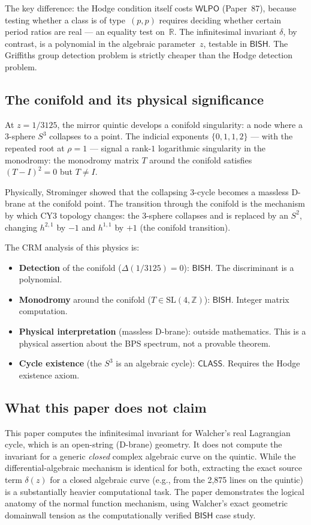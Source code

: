 \documentclass[11pt]{article}
\theoremstyle{plain}
\theoremstyle{definition}
\theoremstyle{remark}
\newcommand{\Z}{\mathbb{Z}}
\newcommand{\R}{\mathbb{R}}
\newcommand{\SL}{\mathrm{SL}}
\newcommand{\BISH}{\ensuremath{\mathsf{BISH}}}
\newcommand{\WLPO}{\ensuremath{\mathsf{WLPO}}}
\newcommand{\CLASS}{\ensuremath{\mathsf{CLASS}}}
\begin{document}
The key difference: the Hodge condition itself costs $\WLPO$ (Paper~87), because testing whether a class is of type~$(p,p)$ requires deciding whether certain period ratios are real --- an equality test on~$\R$. The infinitesimal invariant $\delta$, by contrast, is a polynomial in the algebraic parameter~$z$, testable in $\BISH$. The Griffiths group detection problem is strictly cheaper than the Hodge detection problem.

\subsection{The conifold and its physical significance}

At $z = 1/3125$, the mirror quintic develops a conifold singularity: a node where a $3$-sphere $S^3$ collapses to a point. The indicial exponents $\{0, 1, 1, 2\}$ --- with the repeated root at $\rho = 1$ --- signal a rank-$1$ logarithmic singularity in the monodromy: the monodromy matrix $T$ around the conifold satisfies $(T - I)^2 = 0$ but $T \neq I$.

Physically, Strominger \cite{strominger} showed that the collapsing $3$-cycle becomes a massless D-brane at the conifold point. The transition through the conifold is the mechanism by which CY3 topology changes: the $3$-sphere collapses and is replaced by an $S^2$, changing $h^{2,1}$ by $-1$ and $h^{1,1}$ by $+1$ (the conifold transition).

The CRM analysis of this physics is:
\begin{itemize}[nosep]
\item \textbf{Detection} of the conifold ($\Delta(1/3125) = 0$): $\BISH$. The discriminant is a polynomial.
\item \textbf{Monodromy} around the conifold ($T \in \SL(4,\Z)$): $\BISH$. Integer matrix computation.
\item \textbf{Physical interpretation} (massless D-brane): outside mathematics. This is a physical assertion about the BPS spectrum, not a provable theorem.
\item \textbf{Cycle existence} (the $S^3$ is an algebraic cycle): $\CLASS$. Requires the Hodge existence axiom.
\end{itemize}

\subsection{What this paper does not claim}

This paper computes the infinitesimal invariant for Walcher's real Lagrangian cycle, which is an open-string (D-brane) geometry.  It does not compute the invariant for a generic \emph{closed} complex algebraic curve on the quintic.  While the differential-algebraic mechanism is identical for both, extracting the exact source term $\delta(z)$ for a closed algebraic curve (e.g., from the 2,875 lines on the quintic) is a substantially heavier computational task.  The paper demonstrates the logical anatomy of the normal function mechanism, using Walcher's exact geometric domainwall tension as the computationally verified $\BISH$ case study.
\end{document}
